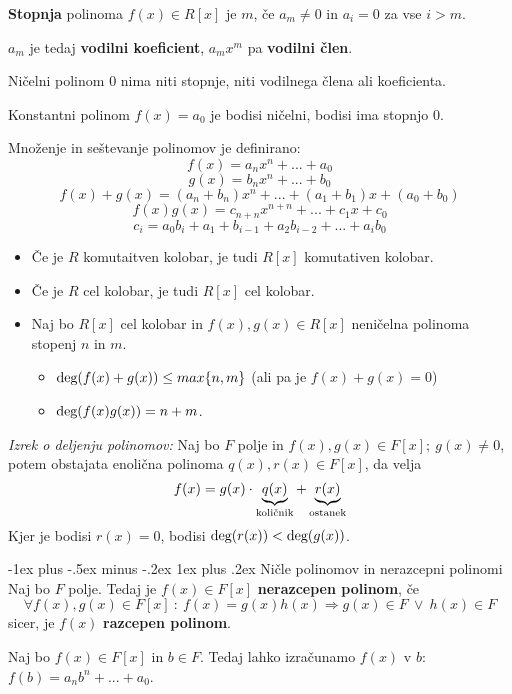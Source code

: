 \documentclass[a4paper,9pt]{extarticle}
\makeatletter
\renewcommand{\subsubsection}{\@startsection{subsubsection}{3}{0mm}%
                                {-1ex plus -.5ex minus -.2ex}%
                                {1ex plus .2ex}%
                                {\normalfont\small\bfseries}}
\makeatother
\begin{document}
\begin{multicols}{3}
\textbf{Stopnja} polinoma $f(x) \in R[x]$ je $m$, če $a_m \neq 0$ in $a_i = 0$ za vse $i>m$.

$a_m$ je tedaj \textbf{vodilni koeficient}, $a_mx^m$ pa \textbf{vodilni člen}.

Ničelni polinom $0$ nima niti stopnje, niti vodilnega člena ali koeficienta.

Konstantni polinom $f(x) = a_0$ je bodisi ničelni, bodisi ima stopnjo $0$.

Množenje in seštevanje polinomov je definirano:
\[f(x) = a_nx^n + ... + a_0\]
\[g(x) = b_nx^n + ... + b_0\]
\[f(x)+g(x) = (a_n+b_n)x^n + ... + (a_1 + b_1)x + (a_0 + b_0)\]
\[f(x)g(x) = c_{n+n}x^{n+n} + ... + c_1x + c_0 \]
\[c_i = a_0b_i + a_1+b_{i-1} + a_2b_{i-2} + ... + a_ib_0\]
\begin{itemize}
    \item Če je $R$ komutaitven kolobar, je tudi $R[x]$ komutativen kolobar.
    \item Če je $R$ cel kolobar, je tudi $R[x]$ cel kolobar.
    \item Naj bo $R[x]$ cel kolobar in $f(x),g(x) \in R[x]$ neničelna polinoma stopenj $n$ in $m$.
    \begin{itemize}
        \item $\textmd{deg}(f(x)+g(x)) \leq max\{n,m\}$ (ali pa je $f(x)+g(x) = 0$)
        \item $\textmd{deg}(f(x)g(x)) = n+m$.
    \end{itemize}
\end{itemize}

\emph{Izrek o deljenju polinomov:} Naj bo $F$ polje in $f(x), g(x) \in F[x];\ g(x) \neq 0$, potem obstajata
enolična polinoma $q(x), r(x) \in F[x]$, da velja
\[f(x) = g(x)\cdot \underbrace{q(x)}_\textmd{količnik} + \underbrace{r(x)}_\textmd{ostanek}\]
Kjer je bodisi $r(x) = 0$, bodisi $\textmd{deg}(r(x)) < \textmd{deg}(g(x))$.

\subsubsection{Ničle polinomov in nerazcepni polinomi}
Naj bo $F$ polje. Tedaj je $f(x) \in F[x]$ \textbf{nerazcepen polinom}, če
\[\forall f(x), g(x) \in F[x]\ :\ f(x) = g(x)h(x) \Rightarrow g(x) \in F\ \vee \ h(x) \in F\]
sicer, je $f(x)$ \textbf{razcepen polinom}.

Naj bo $f(x) \in F[x]$ in $b\in F$. Tedaj lahko izračunamo $f(x)$ v $b$: $f(b) = a_nb^n+...+a_0$.\\\


\end{multicols}
\end{document}
